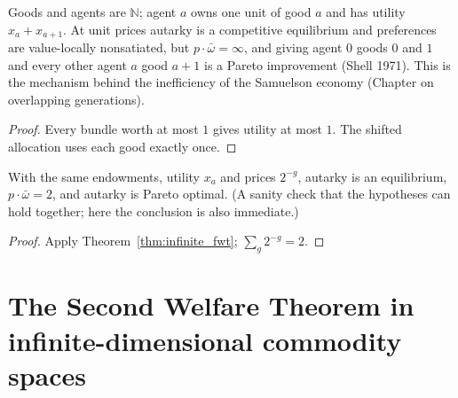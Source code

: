 \begin{theorem}
\label{thm:hilbert_hotel}
\leanok
{}
Goods and agents are $\mathbb{N}$; agent $a$ owns one unit of good $a$ and has utility $x_a + x_{a+1}$. At unit prices
autarky is a competitive equilibrium and preferences are value-locally nonsatiated, but $p \cdot \bar\omega = \infty$, and
giving agent $0$ goods $0$ and $1$ and every other agent $a$ good $a + 1$ is a Pareto improvement (Shell 1971). This is
the mechanism behind the inefficiency of the Samuelson economy (Chapter on overlapping generations).
\end{theorem}
\begin{proof}
\leanok
Every bundle worth at most $1$ gives utility at most $1$. The shifted allocation uses each good exactly once.
\end{proof}

\begin{theorem}
\label{thm:own_good_economy}
\leanok
{}
With the same endowments, utility $x_a$ and prices $2^{-g}$, autarky is an equilibrium, $p \cdot \bar\omega = 2$, and
autarky is Pareto optimal. (A sanity check that the hypotheses can hold together; here the conclusion is also
immediate.)
\end{theorem}
\begin{proof}
\leanok
Apply Theorem~\ref{thm:infinite_fwt}; $\sum_g 2^{-g} = 2$.
\end{proof}

\section{The Second Welfare Theorem in infinite-dimensional commodity spaces}
\label{sec:valuation_equilibrium}

